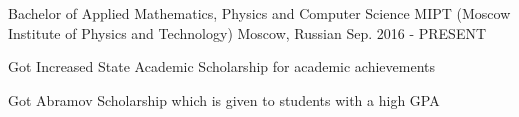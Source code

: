 \begin{cventries}
  \cventry
    {Bachelor of Applied Mathematics, Physics and Computer Science}
    {MIPT (Moscow Institute of Physics and Technology) }
    {Moscow, Russian}
    {Sep. 2016 - PRESENT}
    {
      \begin{cvitems}
        \item {Got Increased State Academic Scholarship for academic achievements}
        \item {Got Abramov Scholarship which is given to students with a high GPA}
      \end{cvitems}
    }
\end{cventries}
